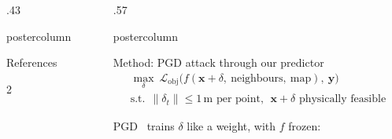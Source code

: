 \documentclass{beamer}
\newlength{\columnheight}
\begin{document}
\begin{frame}
\begin{columns}
\begin{column}{.43\textwidth}
\begin{beamercolorbox}[center]{postercolumn}
\begin{minipage}{.98\textwidth}
{\begin{myblock}{References}
\begin{multicols}{2}
							
							
						\end{multicols}
					\end{myblock}\vfill
		}\end{minipage}\end{beamercolorbox}
	\end{column}
	\begin{column}{.57\textwidth}
		\begin{beamercolorbox}[center]{postercolumn}
			\begin{minipage}{.98\textwidth} %
				\parbox[t][\columnheight]{\textwidth}{
					\begin{myblock}{Method: PGD attack through our predictor}
						\vspace{-0.6cm}
						\begin{gather*}
							\max_{\delta}\ \mathcal{L}_{\text{obj}}\big(f(\mathbf{x}+\delta,\ \text{neighbours},\ \text{map}),\ \mathbf{y}\big)\\
							\text{s.t.}\ \ \|\delta_t\| \le 1\,\text{m per point},\ \ \mathbf{x}+\delta \text{ physically feasible}
						\end{gather*}
						
						\noindent PGD~\cite{madry2018pgd} trains $\delta$ like a weight, with $f$ frozen:
						
						
						

\end{myblock}}
\end{minipage}
\end{beamercolorbox}
\end{column}
\end{columns}
\end{frame}
\end{document}
